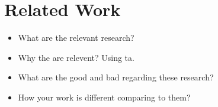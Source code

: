 \section{Related Work}

\begin{itemize}
    \item What are the relevant research?
    \item Why the are relevent? Using \gls{ta}.
    \item What are the good and bad regarding these research?
    \item How your work is different comparing to them?
\end{itemize}